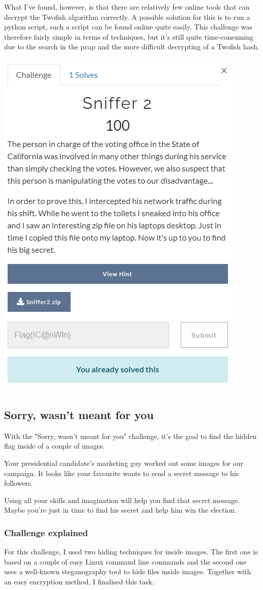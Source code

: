 \documentclass[../main.tex]{subfiles}
\begin{document}
\pagebreak
What I've found, however, is that there are relatively few online tools that can decrypt the Twofish algorithm correctly. A possible solution for this is to run a python script, such a script can be found online quite easily. This challenge was therefore fairly simple in terms of techniques, but it's still quite time-consuming due to the search in the pcap and the more difficult decrypting of a Twofish hash.
 \begin{center}
    \includegraphics[width=0.5\linewidth]{images/Robbe/sniffer2_writeup5.png}
\end{center}
 

\pagebreak
\subsection{Sorry, wasn't meant for you}
With the "Sorry, wasn't meant for you" challenge, it's the goal to find the hidden flag inside of a couple of images.

Your presidential candidate's marketing guy worked out some images for our campaign. It looks like your favourite wants to send a secret message to his followers. 

Using all your skills and imagination will help you find that secret message. Maybe you're just in time to find his secret and help him win the election.

\subsubsection{Challenge explained}
For this challenge, I used two hiding techniques for inside images. The first one is based on a couple of easy Linux command line commands and the second one uses a well-known steganography tool to hide files inside images. Together with an easy encryption method, I finalised this task.
 
\end{document}

